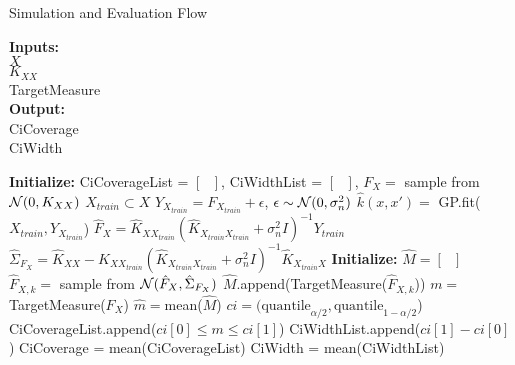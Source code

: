 \begin{algorithm}[h!] \caption{Simulation and Evaluation Flow}
 \hspace*{\algorithmicindent} \textbf{Inputs:} \\
 \hspace*{\algorithmicindent} $X$  \\
 \hspace*{\algorithmicindent} $K_{XX}$ \\
 \hspace*{\algorithmicindent} TargetMeasure  \\
 \hspace*{\algorithmicindent} \textbf{Output:} \\
 \hspace*{\algorithmicindent} CiCoverage \\
 \hspace*{\algorithmicindent} CiWidth \\
\begin{algorithmic}[1]
    \State \textbf{Initialize:} CiCoverageList = $\left[ \text{ } \right]$, CiWidthList = $\left[ \text{ } \right]$,
        \State $F_X =$ sample from $\operatorname{\mathcal{N}}(0, K_{XX})$ 
        \State $X_{train} \subset X$ 
        \State $Y_{X_{train}} = F_{X_{train}} + \epsilon$, $\epsilon \sim  \operatorname{\mathcal{N}}(0, \sigma_n^2)$
        \State $\hat{k}(x,x')=$ GP.fit($X_{train}, Y_{X_{train}}$) 
        \State $\hat{F}_X = \hat{K}_{XX_{train}} (\hat{K}_{X_{train}X_{train}} + \sigma_n^2 I)^{-1} Y_{train}$ 
        \State $\hat{\Sigma}_{F_X} = \hat{K}_{XX} -\hat{K}_{XX_{train}}(\hat{K}_{X_{train}X_{train}} + \sigma_n^2 I)^{-1}\hat{K}_{X_{train}X}$ 
        \State \textbf{Initialize:} $\hat{M} = \left[ \text{ } \right]$
            \State $\hat{F}_{X,k} = $ sample from $\operatorname{\mathcal{N}}(\hat{F}_X, \hat{\Sigma}_{F_X} )$ 
            \State $\hat{M}$.append(TargetMeasure($\hat{F}_{X, k}$)) 
        \EndFor
    \State $m =$ TargetMeasure($F_X$) 
    \State $\hat{m} = $mean($\hat{M}$)
    \State $ci = (\text{quantile}_{\alpha/2}, \text{quantile}_{1-\alpha/2}$) 
    \State CiCoverageList.append($ ci\left[ 0 \right] \leq m \leq ci\left[ 1 \right]$)
    \State CiWidthList.append($ci\left[ 1 \right] - ci\left[ 0 \right] $)
    \EndFor
    \State CiCoverage = mean(CiCoverageList)
    \State CiWidth = mean(CiWidthList)
\end{algorithmic}
\end{algorithm}\label{pc:simulation-evaluation-flow}



